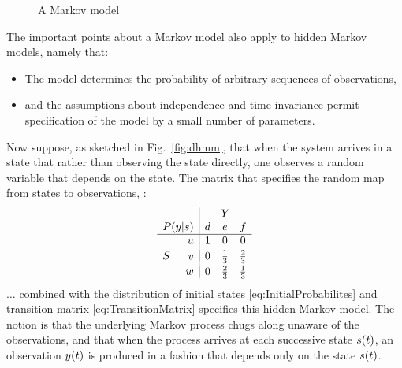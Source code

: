 \begin{figure}[htbp]
  \centering{\plotsize%
    }
  \caption[A Markov model.]{A Markov model}
  \label{fig:mm}
\end{figure}

The important points about a Markov model also apply to hidden
Markov models, namely that:
\begin{itemize}
\item The model determines the probability of arbitrary sequences of
  observations,
\item and the assumptions about independence and time invariance
  permit specification of the model by a small number of parameters.
\end{itemize}

%
Now suppose, as sketched in Fig.~\ref{fig:dhmm}, that when the system
arrives in a state that rather than observing the state directly, one
observes a random variable that depends on the state.  The matrix that
specifies the random map from states to observations, \ie%
:
\begin{equation*}
  \begin{array}{cr|ccc}
      &      &\multicolumn{3}{c}{Y} \\
      \multicolumn{2}{r|}{P(y|s)} & d & e           & f \\ %
      \hline%
      & u      & 1 & 0           & 0 \\
      &        & \vspace{-1 em} \\
    S & v      & 0 & \frac{1}{3} & \frac{2}{3} \\
      &        & \vspace{-1 em} \\
      & w      & 0 & \frac{2}{3} & \frac{1}{3}
  \end{array}%
\end{equation*}
$\ldots$ %
combined with the distribution of initial states
\eqref{eq:InitialProbabilites} and transition matrix
\eqref{eq:TransitionMatrix} specifies this hidden Markov model.  The
notion is that the underlying Markov process chugs along unaware of
the observations, and that when the process arrives at each successive
state ${s}{(t)}$, an observation ${y}{(t)}$ is produced in a fashion
that depends only on the state ${s}{(t)}$.

